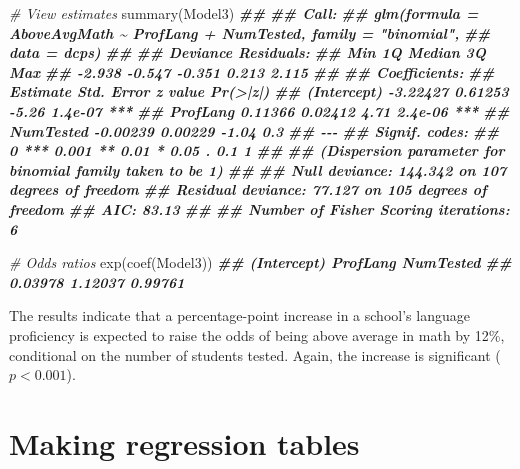 \documentclass[
  12pt,
]{krantz}
\newenvironment{Shaded}{\begin{snugshade}}{\end{snugshade}}
\newcommand{\CommentTok}[1]{\textcolor[rgb]{0.56,0.35,0.01}{\textit{#1}}}
\newcommand{\DocumentationTok}[1]{\textcolor[rgb]{0.56,0.35,0.01}{\textbf{\textit{#1}}}}
\newcommand{\FunctionTok}[1]{\textcolor[rgb]{0.00,0.00,0.00}{#1}}
\newcommand{\NormalTok}[1]{#1}
\begin{document}
\begin{Shaded}
\begin{Highlighting}[]
\CommentTok{\# View estimates}
  \FunctionTok{summary}\NormalTok{(Model3)  }
\DocumentationTok{\#\# }
\DocumentationTok{\#\# Call:}
\DocumentationTok{\#\# glm(formula = AboveAvgMath \textasciitilde{} ProfLang + NumTested, family = "binomial", }
\DocumentationTok{\#\#     data = dcps)}
\DocumentationTok{\#\# }
\DocumentationTok{\#\# Deviance Residuals: }
\DocumentationTok{\#\#    Min      1Q  Median      3Q     Max  }
\DocumentationTok{\#\# {-}2.938  {-}0.547  {-}0.351   0.213   2.115  }
\DocumentationTok{\#\# }
\DocumentationTok{\#\# Coefficients:}
\DocumentationTok{\#\#             Estimate Std. Error z value Pr(\textgreater{}|z|)    }
\DocumentationTok{\#\# (Intercept) {-}3.22427    0.61253   {-}5.26  1.4e{-}07 ***}
\DocumentationTok{\#\# ProfLang     0.11366    0.02412    4.71  2.4e{-}06 ***}
\DocumentationTok{\#\# NumTested   {-}0.00239    0.00229   {-}1.04      0.3    }
\DocumentationTok{\#\# {-}{-}{-}}
\DocumentationTok{\#\# Signif. codes:  }
\DocumentationTok{\#\# 0 \textquotesingle{}***\textquotesingle{} 0.001 \textquotesingle{}**\textquotesingle{} 0.01 \textquotesingle{}*\textquotesingle{} 0.05 \textquotesingle{}.\textquotesingle{} 0.1 \textquotesingle{} \textquotesingle{} 1}
\DocumentationTok{\#\# }
\DocumentationTok{\#\# (Dispersion parameter for binomial family taken to be 1)}
\DocumentationTok{\#\# }
\DocumentationTok{\#\#     Null deviance: 144.342  on 107  degrees of freedom}
\DocumentationTok{\#\# Residual deviance:  77.127  on 105  degrees of freedom}
\DocumentationTok{\#\# AIC: 83.13}
\DocumentationTok{\#\# }
\DocumentationTok{\#\# Number of Fisher Scoring iterations: 6}

\CommentTok{\# Odds ratios}
  \FunctionTok{exp}\NormalTok{(}\FunctionTok{coef}\NormalTok{(Model3))}
\DocumentationTok{\#\# (Intercept)    ProfLang   NumTested }
\DocumentationTok{\#\#     0.03978     1.12037     0.99761}
\end{Highlighting}
\end{Shaded}

The results indicate that a percentage-point increase in a school's language proficiency is expected to raise the odds of being above average in math by 12\%, conditional on the number of students tested. Again, the increase is significant (\(p < 0.001\)).

\hypertarget{making-regression-tables}{%
\section{Making regression tables}\label{making-regression-tables}}
\end{document}

